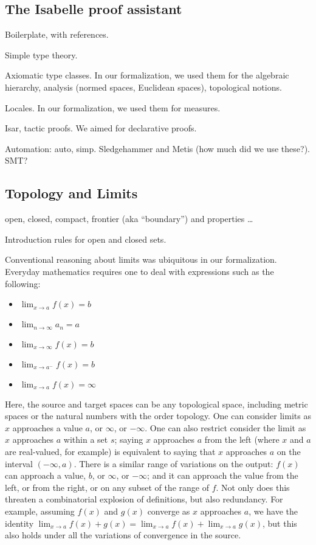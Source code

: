 \documentclass{svjour3}
\newcommand{\todo}[1]{{\color{red}#1}}
\begin{document}
\subsection{The Isabelle proof assistant}

\todo{
Boilerplate, with references.

Simple type theory.

Axiomatic type classes. In our formalization, we used them for the algebraic hierarchy, analysis (normed spaces, Euclidean spaces), topological notions.

Locales. In our formalization, we used them for measures.

Isar, tactic proofs. We aimed for declarative proofs.

Automation: auto, simp. Sledgehammer and Metis (how much did we use these?). SMT?
}

\subsection{Topology and Limits}

\todo{
open, closed, compact, frontier (aka ``boundary'') and properties \ldots

Introduction rules for open and closed sets.
}

Conventional reasoning about limits was ubiquitous in our formalization. Everyday mathematics requires one to deal with expressions such as the following:
\begin{itemize}
 \item $\lim_{x \to a} f(x) = b$
 \item $\lim_{n \to \infty} a_n = a$
 \item $\lim_{x \to \infty} f(x) = b$
 \item $\lim_{x \to a^-} f(x) = b$
 \item $\lim_{x \to a} f(x) = \infty$
\end{itemize}
Here, the source and target spaces can be any topological space, including metric spaces or the natural numbers with the order topology. One can consider limits as $x$ approaches a value $a$, or $\infty$, or $-\infty$. One can also restrict consider the limit as $x$ approaches $a$ within a set $s$; saying $x$ approaches $a$ from the left (where $x$ and $a$ are real-valued, for example) is equivalent to saying that $x$ approaches $a$ on the interval $(-\infty, a)$. There is a similar range of variations on the output: $f(x)$ can approach a value, $b$, or $\infty$, or $-\infty$; and it can approach the value from the left, or from the right, or on any subset of the range of $f$. Not only does this threaten a combinatorial explosion of definitions, but also redundancy. For example, assuming $f(x)$ and $g(x)$ converge as $x$ approaches $a$, we have the identity $\lim_{x \to a} f(x) + g(x) = \lim_{x \to a} f(x) + \lim_{x \to a} g(x)$, but this also holds under all the variations of convergence in the source.
\end{document}
